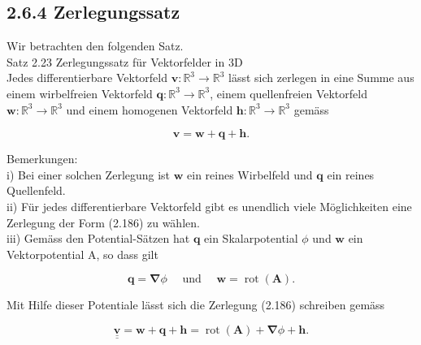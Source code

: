 \documentclass[10pt]{article}
\begin{document}
\subsection*{2.6.4 Zerlegungssatz}
Wir betrachten den folgenden Satz.\\
Satz 2.23 Zerlegungssatz für Vektorfelder in 3D\\
Jedes differentierbare Vektorfeld $\mathbf{v}: \mathbb{R}^{3} \rightarrow \mathbb{R}^{3}$ lässt sich zerlegen in eine Summe aus einem wirbelfreien Vektorfeld $\mathbf{q}: \mathbb{R}^{3} \rightarrow \mathbb{R}^{3}$, einem quellenfreien Vektorfeld $\mathbf{w}: \mathbb{R}^{3} \rightarrow \mathbb{R}^{3}$ und einem homogenen Vektorfeld $\mathbf{h}: \mathbb{R}^{3} \rightarrow \mathbb{R}^{3}$ gemäss


\begin{equation*}
\mathbf{v}=\mathbf{w}+\mathbf{q}+\mathbf{h} . \tag{2.186}
\end{equation*}


Bemerkungen:\\
i) Bei einer solchen Zerlegung ist $\mathbf{w}$ ein reines Wirbelfeld und $\mathbf{q}$ ein reines Quellenfeld.\\
ii) Für jedes differentierbare Vektorfeld gibt es unendlich viele Möglichkeiten eine Zerlegung der Form (2.186) zu wählen.\\
iii) Gemäss den Potential-Sätzen hat $\mathbf{q}$ ein Skalarpotential $\phi$ und $\mathbf{w}$ ein Vektorpotential A, so dass gilt


\begin{equation*}
\mathbf{q}=\boldsymbol{\nabla} \phi \quad \text { und } \quad \mathbf{w}=\operatorname{rot}(\mathbf{A}) . \tag{2.187}
\end{equation*}


Mit Hilfe dieser Potentiale lässt sich die Zerlegung (2.186) schreiben gemäss


\begin{equation*}
\underline{\underline{\mathbf{v}}}=\mathbf{w}+\mathbf{q}+\mathbf{h}=\operatorname{rot}(\mathbf{A})+\boldsymbol{\nabla} \phi+\mathbf{h} . \tag{2.188}
\end{equation*}
\end{document}
